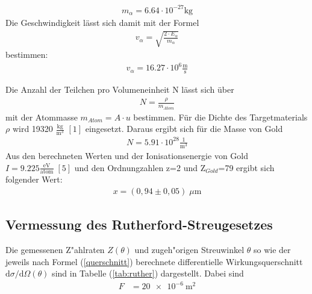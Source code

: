 \begin{align*}
m_{\alpha}= 6.64 \cdot 10^{-27} \text{kg} 
\end{align*} 
Die Geschwindigkeit lässt sich damit mit der Formel 
\begin{align*}
v_{\alpha}= \sqrt{\frac{2\cdot E_{\alpha}}{m_{\alpha}}} 
\end{align*} 
bestimmen:
\begin{align*}
v_{\alpha}=16.27 \cdot 10^{6} \frac{\text{m}}{\text{s}}
\end{align*} 

Die Anzahl der Teilchen pro Volumeneinheit N lässt sich über \begin{align}
N= \frac{\rho}{m_{Atom}} 
\end{align} mit der Atommasse $m_{Atom}=A \cdot u$ bestimmen. 
Für die Dichte des Targetmaterials $\rho$ wird 19320 $\frac{\text{kg}}{\text{m}^3}$ $[1]$ eingesetzt. Daraus ergibt sich für die Masse von Gold 
 \begin{align*}
 N=5.91 \cdot 10^{28} \frac{1}{\text{m}^3}
 \end{align*} 
 Aus den berechneten Werten und der Ionisationsenergie von Gold $I=9.225 \frac{\text{eV}}{\text{atom}} \; [5]$ und den Ordnungzahlen z=2 und Z$_{Gold}$=79 ergibt sich folgender Wert:
 \begin{align*}
 x= ( 0,94 \pm 0,05) \; \mu \text{m}
 \end{align*}

\subsection{Vermessung des Rutherford-Streugesetzes}
  Die gemessenen Z"ahlraten $Z(\theta)$ und zugeh"origen Streuwinkel $\theta$ so wie der jeweils nach Formel (\ref{querschnitt}) berechnete differentielle Wirkungsquerschnitt $\text{d}\sigma/\text{d}\Omega(\theta)$ sind in Tabelle (\ref{tab:ruther}) dargestellt.
  Dabei sind
  \begin{align*}
    F &= \SI{20e-6}{\meter \squared} \\
  \end{align*}


